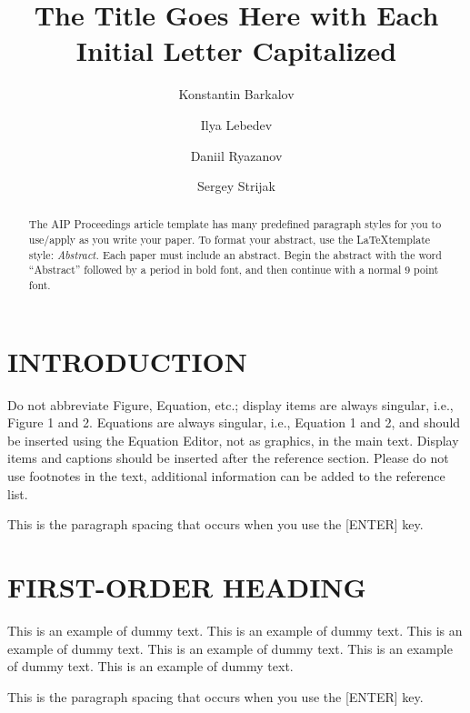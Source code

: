 \documentclass{aip-cp}
\begin{document}
\title{The Title Goes Here with Each Initial Letter Capitalized}

\author[aff1]{Konstantin Barkalov}
\author[aff1]{Ilya Lebedev}
\author[aff2]{Daniil Ryazanov}
\author[aff2]{Sergey Strijak}


\maketitle

\begin{abstract}
The AIP Proceedings article template has many predefined paragraph styles for you to use/apply as you write your paper. To format your abstract, use the \LaTeX template style: {\itshape Abstract.} Each paper must include an abstract. Begin the abstract with the word ``Abstract'' followed by a period in bold font, and then continue with a normal 9 point font.
\end{abstract}

\section{INTRODUCTION}
Do not abbreviate Figure, Equation, etc.; display items are always singular, i.e., Figure 1 and 2. Equations are always singular, i.e., Equation 1 and 2, and should be inserted using the Equation Editor, not as graphics, in the main text.  Display items and captions should be inserted after the reference section. Please do not use footnotes in the text, additional information can be added to the reference list.

This is the paragraph spacing that occurs when you use the [ENTER] key.


\section{FIRST-ORDER HEADING}
This is an example of dummy text. This is an example of dummy text. This is an example of dummy text.
This is an example of dummy text. This is an example of dummy text. This is an example of dummy text.

This is the paragraph spacing that occurs when you use the [ENTER] key.
\end{document}
